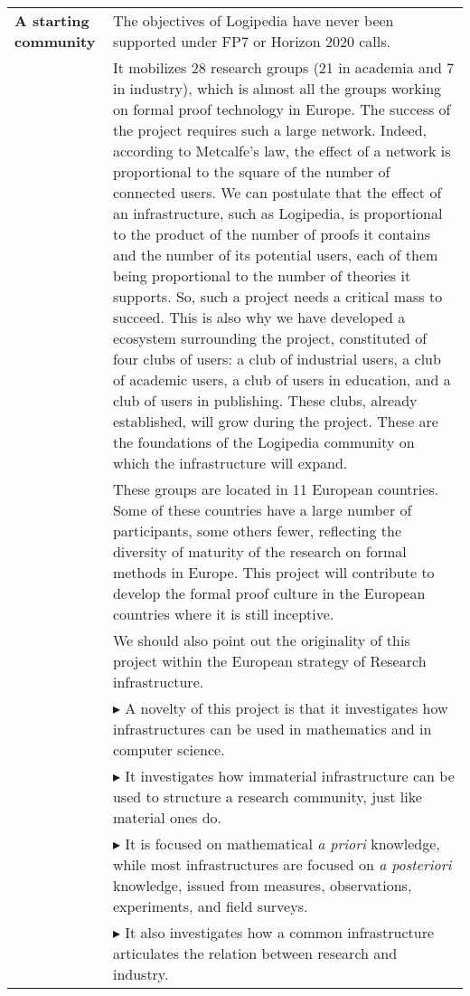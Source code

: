 \begin{longtable}{|p{}|p{}|}
{\bf A starting community} & The objectives of Logipedia have never
been supported under FP7 or Horizon 2020 calls.\\
& \hspace{0.4cm} It mobilizes 28 research groups (21 in academia and 7
in industry), which is almost all the groups working on formal proof
technology in Europe.  The success of the project requires such a
large network.  Indeed, according to Metcalfe's law, the effect of a
network is proportional to the square of the number of connected
users. We can postulate that the effect of an infrastructure, such as
Logipedia, is proportional to the product of the number of proofs it
contains and the number of its potential users, each of them being
proportional to the number of theories it supports. So, such a project
needs a critical mass to succeed. This is also why we have developed a
ecosystem surrounding the project, constituted of four clubs of users:
a club of industrial users, a club of academic users, a club of users
in education, and a club of users in publishing.
These clubs, already established, will grow during the project.  These
are the foundations of the Logipedia community on which the
infrastructure will expand.\\
& \hspace{0.4cm} These groups are located in 11 European countries.
Some of these countries have a large number of participants, some
others fewer, reflecting the diversity of maturity of the research on
formal methods in Europe. This project will contribute to develop the
formal proof
culture in the European countries where it is still inceptive.\\
& \hspace{0.4cm} We should also point out the originality of this
project within the
European strategy of Research infrastructure.\\
& $\blacktriangleright$ A novelty of this project is that it
investigates how infrastructures can be used in mathematics and in
computer science.\\
& $\blacktriangleright$ It investigates how immaterial infrastructure
can be used to structure a research community, just like material ones
do.\\
& $\blacktriangleright$ It is focused on mathematical {\em a priori}
knowledge, while most infrastructures are focused on {\em a
  posteriori} knowledge, issued from measures, observations,
experiments, and field surveys.\\
& $\blacktriangleright$ It also investigates how a common
infrastructure articulates the relation between research and industry.
\\
\hline


\end{longtable}
